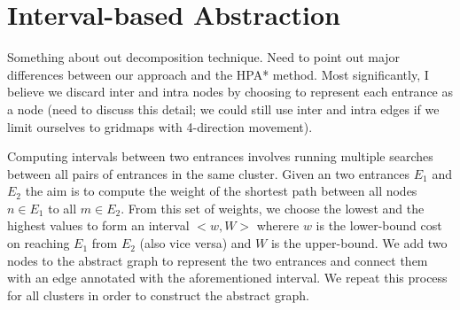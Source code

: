 \section{Interval-based Abstraction}
Something about out decomposition technique. 
Need to point out major differences between our approach and the HPA* method. 
Most significantly, I believe we discard inter and intra nodes by choosing to represent each entrance as a node (need to discuss this detail; we could still use inter and intra edges if we limit ourselves to gridmaps with 4-direction movement).
\par
Computing intervals between two entrances involves running multiple searches between all pairs of entrances in the same cluster. 
Given an two entrances $E_{1}$ and $E_{2}$ the aim is to compute the weight of the shortest path between all nodes $n \in E_{1}$ to all $m \in E_{2}$. 
From this set of weights, we choose the lowest and the highest values to form an interval $<w, W>$ wherere $w$ is the lower-bound cost on reaching $E_{1}$ from $E_{2}$ (also vice versa) and $W$ is the upper-bound.
We add two nodes to the abstract graph to represent the two entrances and connect them with an edge annotated with the aforementioned interval.
We repeat this process for all clusters in order to construct the abstract graph.



